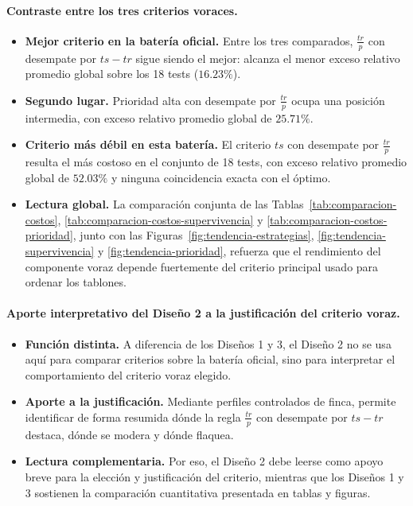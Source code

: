 \documentclass[12pt,a4paper]{article}
\begin{document}
\paragraph{Contraste entre los tres criterios voraces.}
\begin{itemize}
  \item \textbf{Mejor criterio en la bater\'ia oficial.} Entre los tres comparados, \(\frac{tr}{p}\) con desempate por \(ts-tr\) sigue siendo el mejor: alcanza el menor exceso relativo promedio global sobre los 18 tests (\(16.23\%\)).
  \item \textbf{Segundo lugar.} Prioridad alta con desempate por \(\frac{tr}{p}\) ocupa una posici\'on intermedia, con exceso relativo promedio global de \(25.71\%\).
  \item \textbf{Criterio m\'as d\'ebil en esta bater\'ia.} El criterio \(ts\) con desempate por \(\frac{tr}{p}\) resulta el m\'as costoso en el conjunto de 18 tests, con exceso relativo promedio global de \(52.03\%\) y ninguna coincidencia exacta con el \'optimo.
  \item \textbf{Lectura global.} La comparaci\'on conjunta de las Tablas~\ref{tab:comparacion-costos}, \ref{tab:comparacion-costos-supervivencia} y \ref{tab:comparacion-costos-prioridad}, junto con las Figuras~\ref{fig:tendencia-estrategias}, \ref{fig:tendencia-supervivencia} y \ref{fig:tendencia-prioridad}, refuerza que el rendimiento del componente voraz depende fuertemente del criterio principal usado para ordenar los tablones.
\end{itemize}

\paragraph{Aporte interpretativo del Dise\~no 2 a la justificaci\'on del criterio voraz.}
\begin{itemize}
  \item \textbf{Funci\'on distinta.} A diferencia de los Dise\~nos 1 y 3, el Dise\~no 2 no se usa aqu\'i para comparar criterios sobre la bater\'ia oficial, sino para interpretar el comportamiento del criterio voraz elegido.
  \item \textbf{Aporte a la justificaci\'on.} Mediante perfiles controlados de finca, permite identificar de forma resumida d\'onde la regla \(\frac{tr}{p}\) con desempate por \(ts-tr\) destaca, d\'onde se modera y d\'onde flaquea.
  \item \textbf{Lectura complementaria.} Por eso, el Dise\~no 2 debe leerse como apoyo breve para la elecci\'on y justificaci\'on del criterio, mientras que los Dise\~nos 1 y 3 sostienen la comparaci\'on cuantitativa presentada en tablas y figuras.
\end{itemize}
\end{document}
